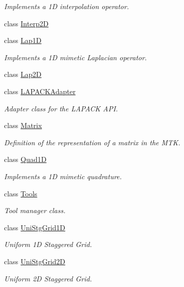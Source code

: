 \begin{DoxyCompactItemize}
\begin{DoxyCompactList}\small\item\em Implements a 1\-D interpolation operator. \end{DoxyCompactList}\item 
class \hyperlink{classmtk_1_1Interp2D}{Interp2\-D}
\item 
class \hyperlink{classmtk_1_1Lap1D}{Lap1\-D}
\begin{DoxyCompactList}\small\item\em Implements a 1\-D mimetic Laplacian operator. \end{DoxyCompactList}\item 
class \hyperlink{classmtk_1_1Lap2D}{Lap2\-D}
\item 
class \hyperlink{classmtk_1_1LAPACKAdapter}{L\-A\-P\-A\-C\-K\-Adapter}
\begin{DoxyCompactList}\small\item\em Adapter class for the L\-A\-P\-A\-C\-K A\-P\-I. \end{DoxyCompactList}\item 
class \hyperlink{classmtk_1_1Matrix}{Matrix}
\begin{DoxyCompactList}\small\item\em Definition of the representation of a matrix in the M\-T\-K. \end{DoxyCompactList}\item 
class \hyperlink{classmtk_1_1Quad1D}{Quad1\-D}
\begin{DoxyCompactList}\small\item\em Implements a 1\-D mimetic quadrature. \end{DoxyCompactList}\item 
class \hyperlink{classmtk_1_1Tools}{Tools}
\begin{DoxyCompactList}\small\item\em Tool manager class. \end{DoxyCompactList}\item 
class \hyperlink{classmtk_1_1UniStgGrid1D}{Uni\-Stg\-Grid1\-D}
\begin{DoxyCompactList}\small\item\em Uniform 1\-D Staggered Grid. \end{DoxyCompactList}\item 
class \hyperlink{classmtk_1_1UniStgGrid2D}{Uni\-Stg\-Grid2\-D}
\begin{DoxyCompactList}\small\item\em Uniform 2\-D Staggered Grid. \end{DoxyCompactList}\end{DoxyCompactItemize}
